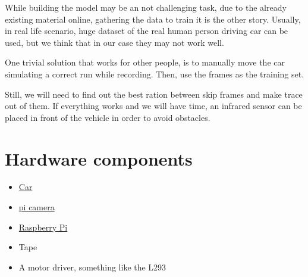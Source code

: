 \documentclass[11pt]{article}
\begin{document}
While building the model may be an not challenging task, due to the already existing material online, gathering the data to train it is the other story. Usually, in real life scenario, huge dataset of the real human person driving car can be used, but we think that in our case they may not work well. 

One trivial solution that works for other people, is to manually move the car simulating a correct run while recording. Then, use the frames as the training set.

Still, we will need to find out the best ration between skip frames and make trace out of them. 
If everything works and we will have time, an infrared sensor can be placed in front of the vehicle in order to avoid obstacles.

\section{Hardware components}
\begin{itemize}
	\item \href{https://it.aliexpress.com/item/Motor-Smart-Robot-Car-Chassis-Kit-Speed-Encoder-Battery-Box-2WD-For-Arduino-Free-Shipping/32766175672.html?spm=a2g0y.search0104.3.127.1fe64471Nd8YgA&ws_ab_test=searchweb0_0,searchweb201602_2_10152_10151_10065_10068_10344_10342_10343_10340_10341_10696_10084_10083_10618_10307_10134_5711215_10313_10059_10534_100031_10103_10624_10623_10622_10621_10620,searchweb201603_25,ppcSwitch_7&algo_expid=3450aa2c-e521-4594-a0c1-4bf8782da265-18&algo_pvid=3450aa2c-e521-4594-a0c1-4bf8782da265&priceBeautifyAB=0}{Car} 
	\item \href{https://it.aliexpress.com/item/Free-Shipping-5MP-New-Raspberry-pi-2-Camera-Module-Board-REV-1-3-5MP-Webcam-Video/32522482332.html?spm=a2g0y.search0104.3.2.7cbac3ebsWO1vu&ws_ab_test=searchweb0_0,searchweb201602_2_10152_10151_10065_10068_10344_10342_10343_10340_10341_10696_10084_10083_10618_10307_5711220_10134_10313_10059_10534_100031_10103_10624_10623_10622_10621_10620,searchweb201603_25,ppcSwitch_7&algo_expid=51db4307-aeb9-446b-a5ce-1ab07e41e291-0&algo_pvid=51db4307-aeb9-446b-a5ce-1ab07e41e291&priceBeautifyAB=0}{pi camera}
	\item \href{https://shop.pimoroni.com/collections/raspberry-pi/products/raspberry-pi-3-b-plus}{Raspberry Pi}
	\item Tape
	\item A motor driver, something like the L293 
	
\end{itemize}
\end{document}
